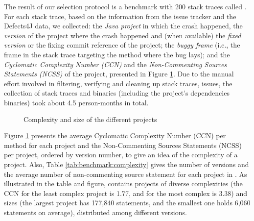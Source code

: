 
The result of our selection protocol is a benchmark with 200 stack traces called \emph{\crashpack}. 
For each stack trace, based on the information from the issue tracker and the Defects4J data, we collected: the \emph{Java project} in which the crash happened, the \emph{version} of the project where the crash happened and (when available) the \emph{fixed version}  or the fixing commit reference of the project; the \emph{buggy frame} (i.e., the frame in the stack trace targeting the method where the bug lays); and the \emph{Cyclomatic Complexity Number (CCN)} and the \emph{Non-Com\-men\-ting Sources Statements (NCSS)} of the project, presented in Figure \ref{fig:ccnncssperapp}. 
Due to the manual effort involved in filtering, verifying and cleaning up stack traces, issues, the collection of stack traces and binaries (including the project's dependencies binaries) took about 4.5 person-months in total.

\begin{figure}[t]
  \centering
  \caption{Complexity and size of the different projects}
  \label{fig:ccnncssperapp}
\end{figure}

Figure \ref{fig:ccnncssperapp} presents the average Cyclomatic Complexity Number (CCN) per method for each project and the Non-Com\-men\-ting Sources Statements (NCSS) per project, ordered by version number, to give an idea of the complexity of a project. Also, Table \ref{tab:benchmark:complexity} gives the number of versions and the average number of non-commenting source statement for each project in \crashpack.
As illustrated in the table and figure, \crashpack contains projects of diverse complexities (the CCN for the least complex project is 1.77, and for the most complex is 3.38) and sizes (the largest project has 177,840 statements, and the smallest one holds 6,060 statements on average), distributed among different versions.

